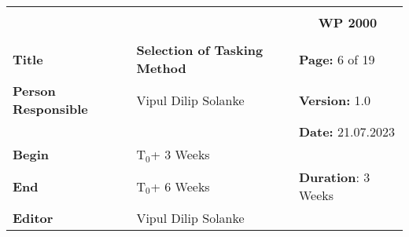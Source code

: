 \begin{table}[!h]
  \begin{center}
    \begin{tabular}{|p{35mm}||p{55mm}|p{50mm}||p{40mm}|}
      \hline
      \multicolumn{3}{|l||}{\textbf{}} & \multicolumn{1}{c|}{}                                                                                                                                                \\
      \multicolumn{3}{|l||}{\textbf{}} & \multicolumn{1}{c|}{\textbf{WP 2000}}                                                                                                                                \\
      \multicolumn{3}{|l||}{\textbf{}} & \multicolumn{1}{c|}{}                                                                                                                                                \\
      \hline\hline
      \textbf{Title}                   & \multicolumn{2}{p{7cm}||}{\textbf{Selection of Tasking Method}}
                                       & \textbf{Page:} 6 of 19                                                                                                                                             \\
      \hline
      \textbf{Person Responsible}        & \multicolumn{2}{l||}{Vipul Dilip Solanke}                                                                                                   & \textbf{Version:} 1.0   \\
      \hline
      \multicolumn{3}{|l||}{}          & \textbf{Date:} 21.07.2023                                                                                                                                          \\
      \hline\hline
      \textbf{Begin}                  & \multicolumn{2}{l||}{T$_0$+ 3 Weeks}                                                                                                                &                         \\
      \hline
      \textbf{End}                    & \multicolumn{2}{l||}{T$_0$+ 6 Weeks}                                                                                                        & \textbf{Duration}: 3 Weeks \\
      \hline\hline
      \textbf{Editor}              & \multicolumn{3}{l|}{Vipul Dilip Solanke}                                                                                                                              \\

\end{tabular}
\end{center}
\end{table}
